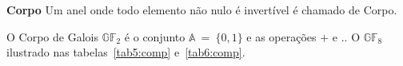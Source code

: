 \begin{definition} {\bf Corpo} \label{corpo}  Um anel onde todo elemento não nulo é invertível é chamado de Corpo.
\end{definition}

\begin{example} O Corpo de Galois $\mathbb{GF}_2$ é o conjunto $\mathbb{A}\ =\ \{0, 1\}$ e as operações $+$ e $.$. O $\mathbb{GF}_8$ ilustrado nas tabelas~\ref{tab5:comp} e~\ref{tab6:comp}.

   
   

\end{example}








